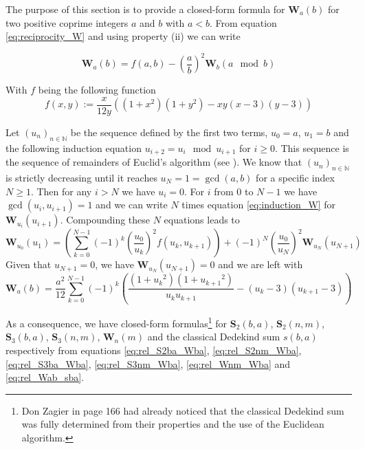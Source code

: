 \documentclass{article}%
\newcommand{\SUMS}[3]{\mathbf{S}_{#1}\left(#2,#3\right)}
\newcommand{\SUMW}[2]{\mathbf{W}_{#1}\left(#2\right)}
\begin{document}
The purpose of this section is to provide a closed-form formula for $\SUMW{a}{b}$ for two positive coprime integers $a$ and $b$ with $a<b$. 
From equation \ref{eq:reciprocity_W} and using property (ii) we can write

\begin{equation}
\SUMW{a}{b} = f(a,b)-\left(\frac{a}{b}\right)^2\SUMW{b}{a\mod b}
\label{eq:induction_W}
\end{equation}

With $f$ being the following function
\begin{equation}
f(x,y) := \frac{x}{12y}\left((1+x^2)(1+y^2)-xy(x-3)(y-3)\right)
\label{eq:def_f}
\end{equation}

Let $(u_n)_{n\in \mathbb{N}}$ be the sequence defined by the first two terms, $u_0=a$, $u_1=b$ and the following induction equation $u_{i+2}=u_i \mod u_{i+1}$ for $i\geq 0$. This sequence is the sequence of remainders of Euclid's algorithm (see \cite{damphousseopuscules}). We know that $(u_n)_{n\in \mathbb{N}}$ is strictly decreasing until it reaches $u_N=1=\gcd(a,b)$ for a specific index $N\geq 1$. Then for any $i>N$ we have $u_i=0$. For $i$ from 0 to $N-1$ we have $\gcd(u_i,u_{i+1})=1$ and we can write $N$ times equation \ref{eq:induction_W} for $\SUMW{u_i}{u_{i+1}}$. Compounding these $N$ equations leads to
\begin{equation*}
\SUMW{u_0}{u_1}=\left( \sum_{k=0}^{N-1}{(-1)}^k{\left(\frac{u_0}{u_k}\right)}^2f(u_k,u_{k+1})\right)+{(-1)}^N{\left(\frac{u_0}{u_N}\right)}^2\SUMW{u_N}{u_{N+1}}
\end{equation*}
Given that $u_{N+1}=0$, we have $\SUMW{u_N}{u_{N+1}}=0$ and we are left with
\begin{equation}
\SUMW{a}{b}=\frac{a^2}{12}\sum_{k=0}^{N-1}{(-1)}^k\left(\frac{(1+{u_k}^2)(1+{u_{k+1}}^2)}{u_k u_{k+1}}-(u_k-3)(u_{k+1}-3)\right)
\label{eq:Wab_fn_ui}
\end{equation}

As a consequence, we have closed-form formulas\footnote{Don Zagier in \cite{zagier1973higher} page 166 had already noticed that the classical Dedekind sum was fully determined from their properties and the use of the Euclidean algorithm.} for $\SUMS{2}{b}{a}$, $\SUMS{2}{n}{m}$, $\SUMS{3}{b}{a}$, $\SUMS{3}{n}{m}$, $\SUMW{n}{m}$ and the classical Dedekind sum $s(b,a)$ respectively from equations \ref{eq:rel_S2ba_Wba}, \ref{eq:rel_S2nm_Wba}, \ref{eq:rel_S3ba_Wba}, \ref{eq:rel_S3nm_Wba}, \ref{eq:rel_Wnm_Wba} and \ref{eq:rel_Wab_sba}. 
\end{document}
